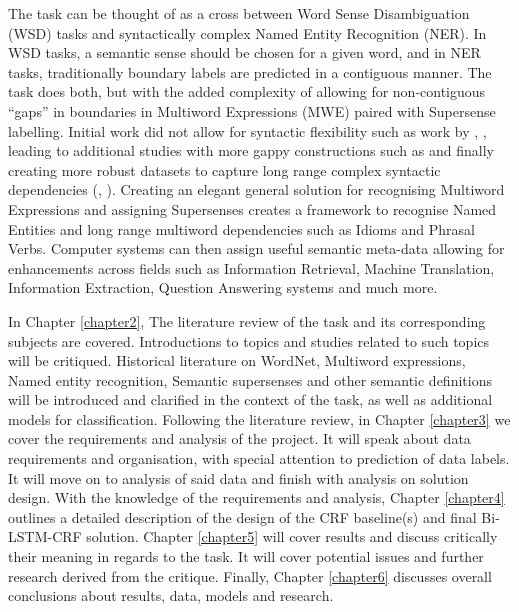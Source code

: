 The \dimsum task can be thought of as a cross between Word Sense Disambiguation (WSD) tasks and syntactically complex Named Entity Recognition (NER). In WSD tasks, a semantic sense should be chosen for a given word, and in NER tasks, traditionally boundary labels are predicted in a contiguous manner. The \dimsum task does both, but with the added complexity of allowing for non-contiguous ``gaps'' in boundaries in Multiword Expressions (MWE) paired with Supersense labelling.
Initial work did not allow for syntactic flexibility such as work by \cite{Katz2006}, \cite{Constant2011}, leading to additional studies with more gappy constructions such as \cite{cook2007pulling} and \cite{Schneider2014} finally creating more robust datasets to capture long range complex syntactic dependencies (\cite{Schneider2014a}, \cite{Schneider2015a}).
Creating an elegant general solution for recognising Multiword Expressions and assigning Supersenses creates a framework to recognise Named Entities and long range multiword dependencies such as Idioms and Phrasal Verbs. Computer systems can then assign useful semantic meta-data allowing for enhancements across fields such as Information Retrieval, Machine Translation, Information Extraction, Question Answering systems and much more. 

In Chapter \ref{chapter2}, The literature review of the task and its corresponding subjects are covered. Introductions to topics and studies related to such topics will be critiqued. Historical literature on WordNet, Multiword expressions, Named entity recognition, Semantic supersenses and other semantic definitions will be introduced and clarified in the context of the task, as well as additional models for classification.
Following the literature review, in Chapter \ref{chapter3} we cover the requirements and analysis of the project. It will speak about data requirements and organisation, with special attention to prediction of data labels. It will move on to analysis of said data and finish with analysis on solution design.
With the knowledge of the requirements and analysis, Chapter \ref{chapter4} outlines a detailed description of the design of the CRF baseline(s) and final Bi-LSTM-CRF solution. 
Chapter \ref{chapter5} will cover results and discuss critically their meaning in regards to the \dimsum task. It will cover potential issues and further research derived from the critique.
Finally, Chapter \ref{chapter6} discusses overall conclusions about results, data, models and research.
